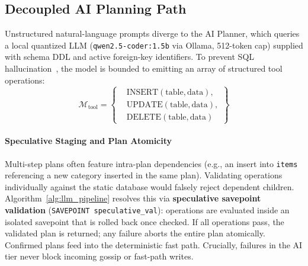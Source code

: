 \subsection{Decoupled AI Planning Path}
Unstructured natural-language prompts diverge to the AI Planner, which queries a local quantized LLM (\texttt{qwen2.5-coder:1.5b} via Ollama, 512-token cap) supplied with schema DDL and active foreign-key identifiers. To prevent SQL hallucination~\cite{ji2023hallucination}, the model is bounded to emitting an array of structured tool operations:
\begin{equation}
\mathcal{M}_{\text{tool}} = \left\{
\begin{aligned}
&\text{INSERT}(\text{table}, \text{data}), \\
&\text{UPDATE}(\text{table}, \text{data}), \\
&\text{DELETE}(\text{table}, \text{data})
\end{aligned}
\right\}
\end{equation}

\paragraph{Speculative Staging and Plan Atomicity}
Multi-step plans often feature intra-plan dependencies (e.g., an insert into \texttt{items} referencing a new category inserted in the same plan). Validating operations individually against the static database would falsely reject dependent children. Algorithm~\ref{alg:llm_pipeline} resolves this via \textbf{speculative savepoint validation} (\texttt{SAVEPOINT speculative\_val}): operations are evaluated inside an isolated savepoint that is rolled back once checked. If all operations pass, the validated plan is returned; any failure aborts the entire plan atomically. Confirmed plans feed into the deterministic fast path. Crucially, failures in the AI tier never block incoming gossip or fast-path writes.


